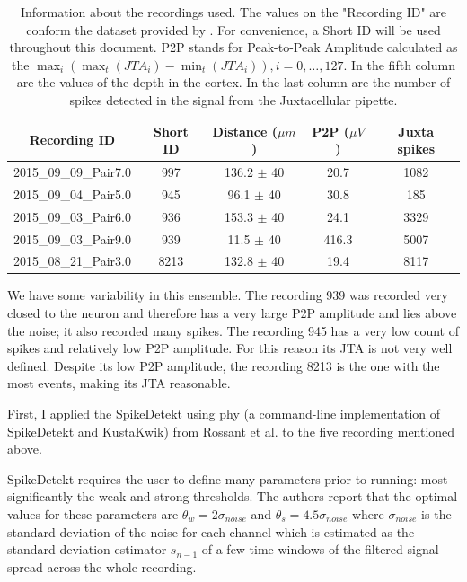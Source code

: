 \documentclass[10pt]{article}
\begin{document}
\begin{table}[!h]
\centering
\begin{tabular}{ccccc}
\textbf{Recording ID} & \textbf{Short ID} & \textbf{Distance ($\mu m$)} & \textbf{P2P ($\mu V$)} & \textbf{Juxta spikes}\\ \hline
2015\_09\_09\_Pair7.0 & 997 & 136.2 $\pm$ 40 & 20.7 & 1082  \\ 
2015\_09\_04\_Pair5.0 & 945 & 96.1 $\pm$ 40 & 30.8 & 185  \\ 
2015\_09\_03\_Pair6.0 & 936 & 153.3 $\pm$  40 & 24.1 & 3329 \\ 
2015\_09\_03\_Pair9.0 & 939 & 11.5 $\pm$  40 & 416.3 & 5007  \\ 
2015\_08\_21\_Pair3.0 & 8213 & 132.8 $\pm$ 40 & 19.4  & 8117 \\ 
\end{tabular}
\caption{Information about the recordings used. The values on the "Recording ID" are conform the dataset provided by \cite{Netoetal}. For convenience, a Short ID will be used throughout this document. P2P stands for Peak-to-Peak Amplitude calculated as the $\max_i \left( \max_t \left( JTA_i \right) - \min_t \left( JTA_i \right)\right), i=0,\ldots , 127$. In the fifth column are the values of the depth in the cortex. In the last column are the number of spikes detected in the signal from the Juxtacellular pipette.}
\label{tab:sum-recordings}
\end{table}

We have some variability in this ensemble. 
The recording 939 was recorded very closed to the neuron and therefore has a very large P2P amplitude and lies above the noise; it also recorded many spikes. 
The recording 945 has a very low count of spikes and relatively low P2P amplitude. For this reason its JTA is not very well defined.
Despite its low P2P amplitude, the recording 8213 is the one with the most events, making its JTA reasonable.


First, I applied the SpikeDetekt using phy (a command-line implementation of SpikeDetekt and KustaKwik) from Rossant et al. to the five recording mentioned above.

SpikeDetekt requires the user to define many parameters prior to running: most significantly the  weak and strong thresholds. The authors report that the optimal values for these parameters are $\theta_w = 2 \sigma_{noise}$ and $\theta_s = 4.5 \sigma_{noise}$ where $\sigma_{noise}$ is the standard deviation of the noise for each channel which is estimated as the standard deviation estimator $s_{n-1}$ of a few time windows of the filtered signal spread across the whole recording.
\end{document}
